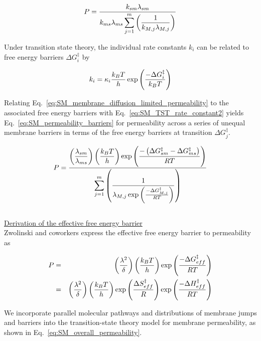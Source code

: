 \begin{equation}
    P = \frac{k_{sm} \lambda_{sm}}{\displaystyle k_{ms} \lambda_{ms} \sum_{j=1}^m \left( \frac{1}{k_{M,j} \lambda_{M,j}} \right)}
    \label{eq:SM_membrane_diffusion_limited_permeability}
\end{equation}

\noindent Under transition state theory, the individual rate constants $k_i$ can be related to free energy barriers $\Delta G^{\ddagger}_i$ by 

\begin{equation}
    k_i = \kappa_i \frac{k_B T}{h} \exp{\left( \frac{-\Delta G^{\ddagger}_i}{k_B T} \right)}
    \label{eq:SM_TST_rate_constant2}
\end{equation}

\noindent Relating Eq.~\ref{eq:SM_membrane_diffusion_limited_permeability} to the associated free energy barriers with Eq.~\ref{eq:SM_TST_rate_constant2} yields Eq.~\ref{eq:SM_permeability_barriers} for permeability across a series of unequal membrane barriers in terms of the free energy barriers at transition $\Delta G_j^{\ddagger}$.

\begin{equation}
    P = \frac{\displaystyle \left( \frac{\lambda_{sm}}{\lambda_{ms}} \right) \left( \frac{k_B T}{h} \right) \exp{\left( \frac{ -\left( \Delta G_{sm}^{\ddagger} - \Delta G_{ms}^{\ddagger} \right)}{R T} \right)}}{\displaystyle \sum_{j=1}^m \left( \frac{1}{\lambda_{M,j} \exp{\left( \frac{-\Delta G_{M,j}^{\ddagger}}{R T} \right)}} \right)}
    \label{eq:SM_permeability_barriers}
\end{equation} \\

\noindent \underline{Derivation of the effective free energy barrier} \\
Zwolinski and coworkers express the effective free energy barrier to permeability as 

\begin{eqnarray}
    P &=& \left( \frac{\lambda^2}{\delta} \right) \left( \frac{k_B T}{h} \right) \exp{\left( \frac{-\Delta G_{eff}^{\ddagger}}{R T} \right)} \nonumber \\ 
    &=& \left( \frac{\lambda^2}{\delta} \right) \left( \frac{k_B T}{h} \right) \exp{\left( \frac{\Delta S_{eff}^{\ddagger}}{R} \right)} \exp{\left( \frac{-\Delta H_{eff}^{\ddagger}}{R T} \right)}
    \label{eq:SM_permeability_eyring1949}
\end{eqnarray}

\noindent We incorporate parallel molecular pathways and distributions of membrane jumps and barriers into the transition-state theory model for membrane permeability, as shown in Eq.~\ref{eq:SM_overall_permeability}.

